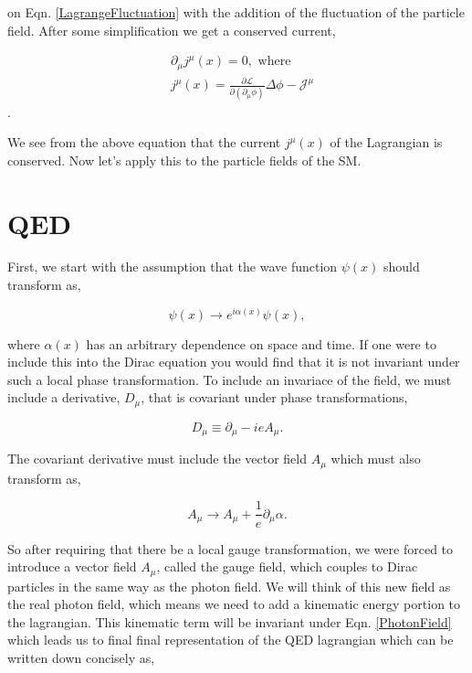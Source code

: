  on Eqn. \ref{LagrangeFluctuation} with the addition of the fluctuation of the particle field. After some simplification we get a conserved current,
 
 \begin{equation}
 \begin{split}
 & \partial_\mu j^\mu(x)=0, \text{ where}\\
 & j^\mu(x)=\frac{\partial\mathcal{L}}{\partial(\partial_\mu\phi)}\Delta\phi-\mathcal{J}^\mu
 \end{split}
 \end{equation}.
 
 We see from the above equation that the current $j^\mu(x)$ of the Lagrangian is conserved. Now let's apply this to the particle fields of the SM.
 
 \section{QED}
 
 First, we start with the assumption that the wave function $\psi(x)$ should transform as,
 
 \begin{equation}\label{U1gauge}
 \psi(x)\rightarrow e^{i\alpha(x)}\psi(x),
 \end{equation}
 
 where $\alpha(x)$ has an arbitrary dependence on space and time. If one were to include this into the Dirac equation you would find that it is not invariant under such a local phase transformation. To include an invariace of the field, we must include a derivative, $D_\mu$, that is covariant under phase transformations,
 
 \begin{equation}\label{QEDCovariantD}
 D_\mu\equiv\partial_\mu-ieA_\mu.
 \end{equation}
 
 The covariant derivative must include the vector field $A_\mu$ which must also transform as,
  
 \begin{equation}\label{PhotonField}
 A_\mu\rightarrow A_\mu+\frac{1}{e}\partial_\mu\alpha.
 \end{equation}
 
 So after requiring that there be a local gauge transformation, we were forced to introduce a vector field $A_\mu$, called the gauge field, which couples to Dirac particles in the same way as the photon field. We will think of this new field as the real photon field, which means we need to add a kinematic energy portion to the lagrangian. This kinematic term will be invariant under Eqn. \ref{PhotonField} which leads us to final final representation of the QED lagrangian which can be written down concisely as, 
 
